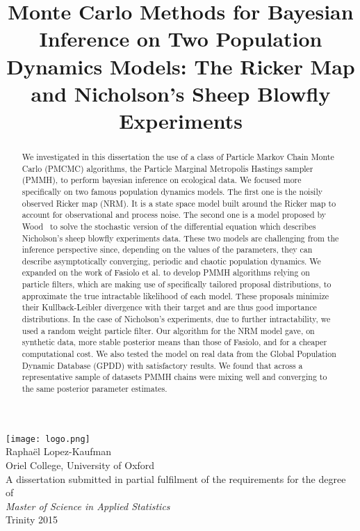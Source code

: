 \documentclass[12pt]{article}
\title{Monte Carlo Methods for Bayesian Inference on Two Population
	Dynamics Models: The Ricker Map and Nicholson's Sheep Blowfly Experiments}
\date{}
\begin{document}
	\maketitle 
	\thispagestyle{empty}
	\begin{center}
		\vspace{-5mm}
		\texttt{[image: logo.png]} \\
		\vspace{20mm}
		{\large Raphaël Lopez-Kaufman} \\
		\vspace{2mm}
		{\large Oriel College, University of Oxford} \\
		\vspace{50mm}
		A dissertation submitted in partial fulfilment of the requirements for the degree of \\
		\vspace{1mm}
		\textit{Master of Science in Applied Statistics} \\
		\vspace{1mm}
		Trinity 2015
	\end{center}
	
	\vspace{25 mm}
	
	\clearpage
	\begin{abstract}
		We investigated in this dissertation the use of a class of Particle Markov Chain Monte Carlo (PMCMC) algorithms, the Particle Marginal Metropolis Hastings sampler (PMMH), to perform bayesian inference on ecological data. We focused more specifically on two famous population dynamics models. The first one is the noisily observed Ricker map (NRM). It is a state space model built around the Ricker map to account for observational and process noise. The second one is a model proposed by Wood~\cite{wood2010statistical} to solve the stochastic version of the differential equation which describes Nicholson's sheep blowfly experiments data. These two models are challenging from the inference perspective since, depending on the values of the parameters, they can describe asymptotically converging, periodic and chaotic population dynamics. We expanded on the work of Fasiolo et al.\cite{fasiolo2014statistical} to develop PMMH algorithms relying on particle filters, which are making use of specifically tailored proposal distributions, to approximate the true intractable likelihood of each model. These proposals minimize their Kullback-Leibler divergence with their target and are thus good importance distributions. In the case of Nicholson's experiments, due to further intractability, we used a random weight particle filter. Our algorithm for the NRM model gave, on synthetic data, more stable  posterior means than those of Fasiolo, and for a cheaper computational cost. We also tested the model on real data from the Global Population Dynamic Database (GPDD) with satisfactory results. We found that across a representative sample of datasets PMMH chains were mixing well and converging to the same posterior parameter estimates.
	\end{abstract}
	
\end{document}
